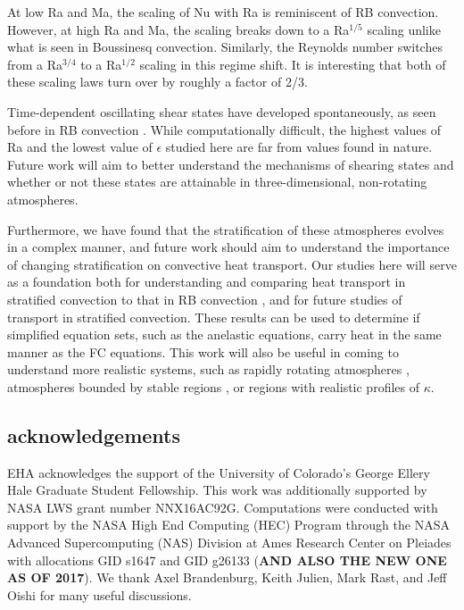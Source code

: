 \documentclass[aps, prl, twocolumn, nofootinbib, groupedaddress, amsfonts, amssymb, amsmath]{revtex4-1}
\begin{document}
At low Ra and Ma, the scaling of Nu with Ra is reminiscent of RB convection.  However,
at high Ra and Ma, the scaling breaks down to a Ra$^{1/5}$ scaling unlike what is seen
in Boussinesq convection.  Similarly, the Reynolds number switches from a Ra$^{3/4}$ to
a Ra$^{1/2}$ scaling in this regime shift.  It is interesting that both of these
scaling laws turn over by roughly a factor of 2/3.

Time-dependent oscillating shear states have developed spontaneously, as seen before in RB convection
\cite{goluskin&all2014}.  While computationally difficult, the highest values of Ra and the lowest value
of $\epsilon$ studied here are far from values found in nature.  Future work will aim to better understand the mechanisms of shearing states and
whether or not these states are attainable in three-dimensional, non-rotating atmospheres. 

Furthermore, we have found that the stratification of these atmospheres evolves in a complex
manner, and future work should aim to understand the importance of changing stratification on
convective heat transport. Our studies
here will serve as a foundation both for understanding and 
comparing heat transport in stratified convection
to that in RB convection \cite{johnston&doering2009}, 
and for future studies of transport in stratified
convection.  These results can be used to determine if simplified equation sets, 
such as the anelastic equations, carry heat in the same manner as the FC equations.
This work will also be useful in coming to understand more realistic systems, 
such as rapidly rotating atmospheres \cite{julien&all2012},
atmospheres bounded by stable regions \cite{hurlburt&all1986}, 
or regions with realistic profiles of $\kappa$.



\subsection{acknowledgements}
EHA acknowledges the support of the University of Colorado's George 
Ellery Hale Graduate Student Fellowship.
This work was additionally supported by  NASA LWS grant number NNX16AC92G.  
Computations were conducted 
with support by the NASA High End Computing (HEC) Program through the NASA 
Advanced Supercomputing (NAS) Division at Ames Research Center on Pleiades
with allocations GID s1647 and GID g26133 (\textbf{AND ALSO THE NEW ONE AS OF 2017}).
We thank Axel Brandenburg, Keith Julien, Mark Rast, and Jeff Oishi for many useful discussions.


\end{document}
